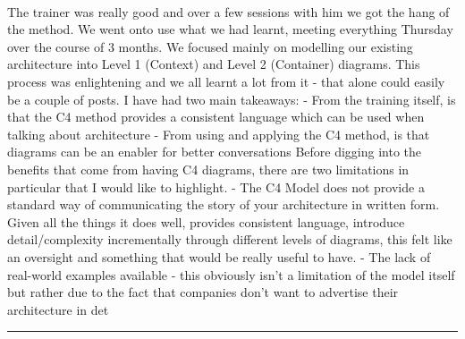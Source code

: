 \documentclass[10pt,a4paper]{article}
\begin{document}
\begin{multicols*}{2}
\paragraph{}
 The trainer was really good and over a few sessions with him we got the hang of the method. We went onto use what we had learnt, meeting everything Thursday over the course of 3 months. We focused mainly on modelling our existing architecture into Level 1 (Context) and Level 2 (Container) diagrams. This process was enlightening and we all learnt a lot from it - that alone could easily be a couple of posts.
I have had two main takeaways:
- From the training itself, is that the C4 method provides a consistent language which can be used when talking about architecture
- From using and applying the C4 method, is that diagrams can be an enabler for better conversations
Before digging into the benefits that come from having C4 diagrams, there are two limitations in particular that I would like to highlight.
-
The C4 Model does not provide a standard way of communicating the story of your architecture in written form. Given all the things it does well, provides consistent language, introduce detail/complexity incrementally through different levels of diagrams, this felt like an oversight and something that would be really useful to have.
-
The lack of real-world examples available - this obviously isn’t a limitation of the model itself but rather due to the fact that companies don’t want to advertise their architecture in det
\par\noindent\textcolor{red}{\rule{\linewidth}{0.2mm}}
\vfill
\null
\noindent\begin{minipage}{\linewidth}

\end{minipage}
\end{multicols*}
\end{document}
